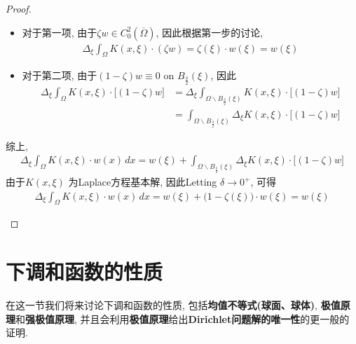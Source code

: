 \begin{proposition}
\begin{proof}
\begin{enumerate}
				\newpage
				
				\begin{itemize}
					\item 对于第一项, 由于$\zeta w \in C_{0}^2 \left( \overline{\Omega} \right)$, 因此根据第一步的讨论, 
					\begin{align*}
						\Delta_{\xi} \int_{\Omega} K(x , \xi) \cdot (\zeta w) 
						= \zeta(\xi) \cdot w(\xi) 
						= w(\xi)
					\end{align*}
					
					\vspace*{2em}
					
					\item 对于第二项, 由于$(1 - \zeta)w \equiv 0$ on $B_{\tfrac{\delta}{2}}(\xi)$, 因此
					\begin{align*}
						\Delta_{\xi} \int_{\Omega} K(x , \xi) \cdot \Big[ (1 - \zeta) w \Big] 
						&= \Delta_{\xi} \int_{\Omega \backslash B_{\tfrac{\delta}{2}}(\xi)} K(x , \xi) \cdot \Big[ (1 - \zeta) w \Big] \\
						&= \int_{\Omega \backslash B_{\tfrac{\delta}{2}}(\xi)} \Delta_{\xi} K(x , \xi) \cdot \Big[ (1 - \zeta) w \Big] 
					\end{align*}
				\end{itemize}
				
				\vspace*{2em}
				
				综上, 
				\begin{align*}
					\Delta_{\xi} \int_{\Omega} K(x , \xi) \cdot w(x) \, dx 
					= w(\xi) + \int_{\Omega \backslash B_{\tfrac{\delta}{2}}(\xi)} \Delta_{\xi} K(x , \xi) \cdot \Big[ (1 - \zeta) w \Big]
				\end{align*}
				由于$K(x , \xi)$ 为Laplace方程基本解, 因此Letting $\delta \to 0^+$, 可得
				\begin{align*}
					\Delta_{\xi} \int_{\Omega} K(x , \xi) \cdot w(x) \, dx 
					= w(\xi) + \Big( 1 - \zeta(\xi) \Big) \cdot w(\xi) 
					= w(\xi)
				\end{align*}
			\end{enumerate}
		\end{proof}
	\end{proposition}

\newpage

\section{下调和函数的性质}
	在这一节我们将来讨论下调和函数的性质, 包括\textbf{均值不等式(球面、球体)}, \textbf{极值原理}和\textbf{强极值原理}, 并且会利用\textbf{极值原理}给出\textbf{Dirichlet问题解的唯一性}的更一般的证明. 
	
